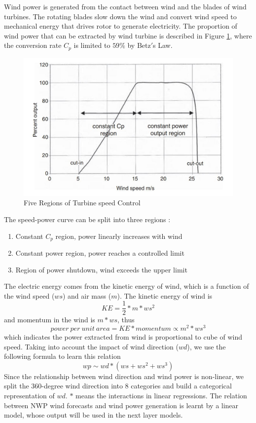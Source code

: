 \documentclass[conference]{IEEEtran}
\begin{document}
Wind power is generated from the contact between wind and the blades of wind turbines. The rotating blades slow down the wind and convert wind speed to mechanical energy that drives rotor to generate electricity. The proportion of wind power that can be extracted by wind turbine is described in Figure \ref{fig:turbine}, where the conversion rate $C_p$ is limited to $59\%$ by Betz$'$s Law. 
\begin{figure}
\centering
\includegraphics[width=0.8\columnwidth]{FIG/turbine}
\caption{Five Regions of Turbine speed Control \cite{patel2005wind}}
\label{fig:turbine}
\end{figure}
The speed-power curve can be split into three regions \cite{patel2005wind}: 
\begin{enumerate}
    \item Constant $C_p$ region, power linearly increases with wind
    \item Constant power region, power reaches a controlled limit 
    \item Region of power shutdown, wind exceeds the upper limit
\end{enumerate}

The electric energy comes from the kinetic energy of wind, which is a function of the wind speed ($ws$) and air mass ($m$). The kinetic energy of wind is
\begin{equation}
    KE = \frac{1}{2}*m*ws^2
\end{equation}
and momentum in the wind is $m*ws$, thus
\begin{equation}
    power\ per\ unit\ area = KE*momentum \propto m^2*ws^3
\end{equation}
which indicates the power extracted from wind is proportional to cube of wind speed. Taking into account the impact of wind direction ($wd$), we use the following formula to learn this relation
\begin{equation}
    wp \sim wd * (ws + ws^2 + ws^3)
\end{equation}
Since the relationship between wind direction and wind power is non-linear, we split the 360-degree wind direction into 8 categories and build a categorical representation of $wd$. $*$ means the interactions in linear regressions. The relation between NWP wind forecasts and wind power generation is learnt by a linear model, whose output will be used in the next layer models. 
\end{document}
